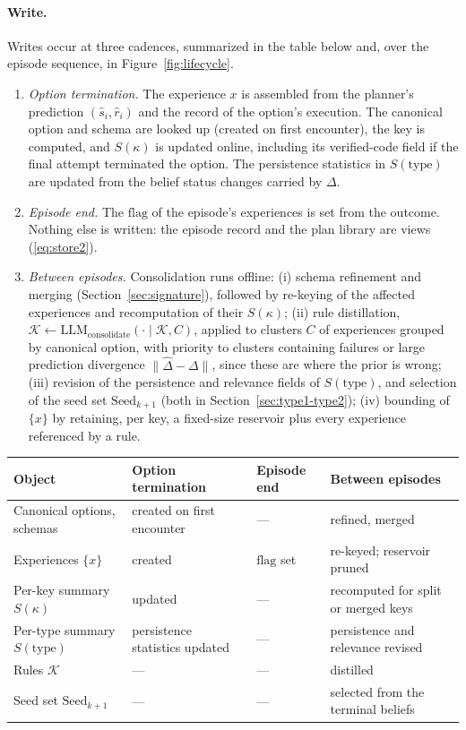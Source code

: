 \documentclass[11pt]{article}
\newcommand{\llm}[1]{\mathrm{LLM}_{\mathrm{#1}}}
\newcommand{\calK}{\mathcal{K}}
\newcommand{\shat}{\hat{s}}
\newcommand{\type}{\mathrm{type}}
\begin{document}
\paragraph{Write.}
Writes occur at three cadences, summarized in the table below and, over the episode sequence, in Figure~\ref{fig:lifecycle}.
\begin{enumerate}[leftmargin=1.5em,itemsep=1pt]
\item \emph{Option termination.} The experience $x$ is assembled from the planner's prediction $(\shat_i,\hat r_i)$ and the record of the option's execution. The canonical option and schema are looked up (created on first encounter), the key is computed, and $S(\kappa)$ is updated online, including its verified-code field if the final attempt terminated the option. The persistence statistics in $S(\type)$ are updated from the belief status changes carried by $\Delta$.
\item \emph{Episode end.} The $\mathrm{flag}$ of the episode's experiences is set from the outcome. Nothing else is written: the episode record and the plan library are views (\ref{eq:store2}).
\item \emph{Between episodes.} Consolidation runs offline: (i) schema refinement and merging (Section~\ref{sec:signature}), followed by re-keying of the affected experiences and recomputation of their $S(\kappa)$; (ii) rule distillation, $\calK\leftarrow\llm{consolidate}(\cdot\mid\calK,C)$, applied to clusters $C$ of experiences grouped by canonical option, with priority to clusters containing failures or large prediction divergence $\|\hat\Delta-\Delta\|$, since these are where the prior is wrong; (iii) revision of the persistence and relevance fields of $S(\type)$, and selection of the seed set $\mathrm{Seed}_{k+1}$ (both in Section~\ref{sec:type1-type2}); (iv) bounding of $\{x\}$ by retaining, per key, a fixed-size reservoir plus every experience referenced by a rule.
\end{enumerate}

\begin{center}\small
\begin{tabular}{@{}>{\raggedright\arraybackslash}p{}>{\raggedright\arraybackslash}p{}>{\raggedright\arraybackslash}p{}>{\raggedright\arraybackslash}p{}@{}}
\toprule
Object & Option termination & Episode end & Between episodes \\
\midrule
Canonical options, schemas & created on first encounter & --- & refined, merged \\
Experiences $\{x\}$ & created & $\mathrm{flag}$ set & re-keyed; reservoir pruned \\
Per-key summary $S(\kappa)$ & updated & --- & recomputed for split or merged keys \\
Per-type summary $S(\type)$ & persistence statistics updated & --- & persistence and relevance revised \\
Rules $\calK$ & --- & --- & distilled \\
Seed set $\mathrm{Seed}_{k+1}$ & --- & --- & selected from the terminal beliefs \\
\bottomrule
\end{tabular}
\end{center}
\end{document}
